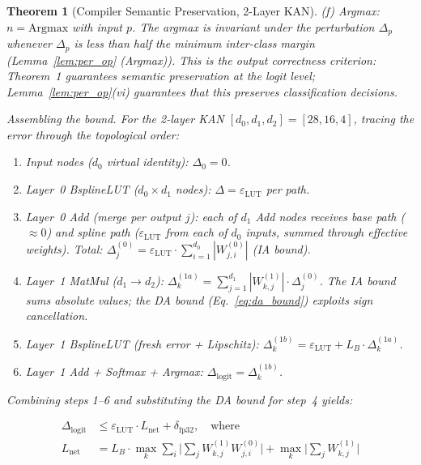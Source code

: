 \documentclass[journal,onecolumn]{IEEEtran}
\newtheorem{theorem}{Theorem}
\begin{document}
\begin{theorem}[Compiler Semantic Preservation, 2-Layer KAN]
\vspace{2pt}
\noindent\textit{(f) Argmax:} $n = \text{Argmax}$ with input $p$. The
argmax is invariant under the perturbation $\Delta_p$ whenever $\Delta_p$
is less than half the minimum inter-class margin (Lemma~\ref{lem:per_op} (Argmax)). This is
the \textit{output correctness criterion}: Theorem~1 guarantees semantic
preservation at the logit level; Lemma~\ref{lem:per_op}(vi) guarantees that this
preserves classification decisions.

\vspace{4pt}
\textit{Assembling the bound.} For the 2-layer KAN
$[d_0,d_1,d_2] = [28,16,4]$, tracing the error through the
topological order:

\begin{enumerate}
    \item[1.] Input nodes ($d_0$ virtual identity): $\Delta_0 = 0$.
    \item[2.] Layer~0 BsplineLUT ($d_0 \times d_1$ nodes):
             $\Delta = \varepsilon_{\text{LUT}}$ per path.
    \item[3.] Layer~0 Add (merge per output $j$): each of $d_1$ Add
            nodes receives base path ($\approx 0$) and spline path
             ($\varepsilon_{\text{LUT}}$ from each of $d_0$ inputs,
            summed through effective weights). Total:
             $\Delta_j^{(0)} = \varepsilon_{\text{LUT}} \cdot
             \sum_{i=1}^{d_0} |W^{(0)}_{j,i}|$ (IA bound).
    \item[4.] Layer~1 MatMul ($d_1 \to d_2$): $\Delta_k^{(1a)} =
             \sum_{j=1}^{d_1} |W^{(1)}_{k,j}| \cdot \Delta_j^{(0)}$.
            The IA bound sums absolute values; the DA bound
             (Eq.~\ref{eq:da_bound}) exploits sign cancellation.
    \item[5.] Layer~1 BsplineLUT (fresh error + Lipschitz):
             $\Delta_k^{(1b)} = \varepsilon_{\text{LUT}} + L_B \cdot
             \Delta_k^{(1a)}$.
    \item[6.] Layer~1 Add + Softmax + Argmax: $\Delta_{\text{logit}}
             = \Delta_k^{(1b)}$.
\end{enumerate}

Combining steps 1--6 and substituting the DA bound for step~4 yields:

\begin{equation}
\begin{aligned}
\Delta_{\text{logit}} &\leq \varepsilon_{\text{LUT}} \cdot L_{\text{net}}
+ \delta_{\text{fp32}}, \quad \text{where} \\
L_{\text{net}} &= L_B \cdot \max_k \sum_i \bigl|\sum_j W^{(1)}_{k,j}
W^{(0)}_{j,i}\bigr| + \max_k \bigl|\sum_j W^{(1)}_{k,j}\bigr|
\end{aligned}
\end{equation}


\end{theorem}
\end{document}
